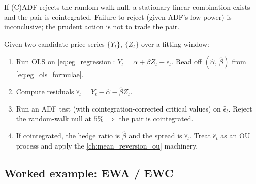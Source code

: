 If (C)ADF rejects the random-walk null, a stationary linear
combination exists and the pair is cointegrated. Failure to reject
(given ADF's low power) is inconclusive; the prudent action is not
to trade the pair.

\begin{keyfactbox}
Given two candidate price series $\{Y_t\}$, $\{Z_t\}$ over a
fitting window:
\begin{enumerate}
  \item Run OLS on \eqref{eq:eg_regression}: $Y_t = \alpha
  + \beta Z_t + \epsilon_t$. Read off
  $(\hat\alpha,\,\hat\beta)$ from \eqref{eq:eg_ols_formulae}.
  \item Compute residuals
  $\hat\epsilon_t = Y_t - \hat\alpha - \hat\beta Z_t$.
  \item Run an ADF test (with cointegration-corrected critical
  values) on $\hat\epsilon_t$. Reject the random-walk null at
  $5\%$ $\Rightarrow$ the pair is cointegrated.
  \item If cointegrated, the hedge ratio is $\hat\beta$ and
  the spread is $\hat\epsilon_t$. Treat $\hat\epsilon_t$ as an
  OU process and apply the
  \cref{ch:mean_reversion_ou} machinery.
\end{enumerate}
\end{keyfactbox}

\subsection{Worked example: EWA / EWC}
\label{subsec:ch10_ewa_ewc}

